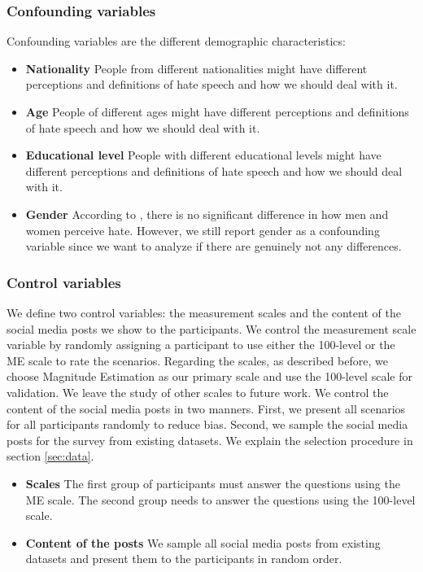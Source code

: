 \subsubsection{Confounding variables}
%
Confounding variables are the different demographic characteristics:
%
\begin{itemize}
    \item \textbf{Nationality} People from different nationalities might have different perceptions and definitions of hate speech and how we should deal with it.
    \item \textbf{Age} People of different ages might have different perceptions and definitions of hate speech and how we should deal with it.
    \item \textbf{Educational level} People with different educational levels might have different perceptions and definitions of hate speech and how we should deal with it.
    \item \textbf{Gender} According to \citet{gold2018women}, there is no significant difference in how men and women perceive hate. However, we still report gender as a confounding variable since we want to analyze if there are genuinely not any differences.
\end{itemize}

\subsubsection{Control variables}
%
We define two control variables: the measurement scales and the content of the social media posts we show to the participants.
%
We control the measurement scale variable by randomly assigning a participant to use either the 100-level or the ME scale to rate the scenarios.
%
Regarding the scales, as described before, we choose Magnitude Estimation as our primary scale and use the 100-level scale for validation.
%
We leave the study of other scales to future work.
%
We control the content of the social media posts in two manners.
%
First, we present all scenarios for all participants randomly to reduce bias.
%
Second, we sample the social media posts for the survey from existing datasets.
% 
We explain the selection procedure in section \ref{sec:data}.
%
\begin{itemize}
    \item \textbf{Scales} The first group of participants must answer the questions using the ME scale. The second group needs to answer the questions using the 100-level scale.
    \item \textbf{Content of the posts} We sample all social media posts from existing datasets and present them to the participants in random order.
\end{itemize}

